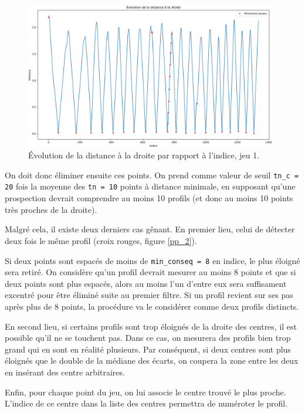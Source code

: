 \documentclass[12pt]{article}
\begin{document}
    \begin{figure}[ht!]
        \centering
        \includegraphics[width=0.98\textwidth]{Images/PseudoProf_dist_1.png}  
        \caption{\label{pp_1} Évolution de la distance à la droite par rapport à l'indice, jeu 1.}
    \end{figure}

    On doit donc éliminer ensuite ces points. On prend comme valeur de seuil \texttt{tn\_c = 20} fois la moyenne des \texttt{tn = 10} points à distance minimale, en supposant qu'une prospection devrait comprendre au moins 10 profils (et donc au moins 10 points très proches de la droite).

    Malgré cela, il existe deux derniers cas gênant. En premier lieu, celui de détecter deux fois le même profil (croix rouges, figure \ref{pp_2}).

    \vskip 15pt

    Si deux points sont espacés de moins de \texttt{min\_conseq = 8} en indice, le plus éloigné sera retiré. On considère qu'un profil devrait mesurer au moins 8 points et que si deux points sont plus espacés, alors au moins l'un d'entre eux sera suffisament excentré pour être éliminé suite au premier filtre. Si un profil revient sur ses pas après plus de 8 points, la procédure va le considérer comme deux profils distincts.

    En second lieu, si certains profils sont trop éloignés de la droite des centres, il est possible qu'il ne se touchent pas. Dans ce cas, on mesurera des profils bien trop grand qui en sont en réalité plusieurs. Par conséquent, si deux centres sont plus éloignés que le double de la médiane des écarts, on coupera la zone entre les deux en insérant des centre arbitraires.

    Enfin, pour chaque point du jeu, on lui associe le centre trouvé le plus proche. L'indice de ce centre dans la liste des centres permettra de numéroter le profil.
\end{document}

